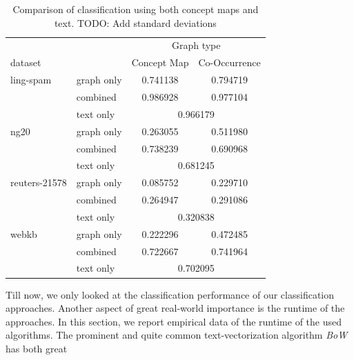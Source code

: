 

\begin{table}[htb!]
\centering
\begin{tabular}{llcc}
  &  & \multicolumn{2}{c}{Graph type} \\
   dataset   & &  Concept Map &  Co-Occurrence \\
\midrule
ling-spam 
          & graph only &  0.741138 &  0.794719\\
          & combined &  0.986928 &  0.977104\\
          & text only & \multicolumn{2}{c}{ 0.966179 }\\
\midrule
ng20 
          & graph only &  0.263055 &  0.511980\\
          & combined &  0.738239 &  0.690968\\
          & text only & \multicolumn{2}{c}{ 0.681245 }\\
\midrule
reuters-21578 
          & graph only &  0.085752 &  0.229710\\
          & combined &  0.264947 &  0.291086\\
          & text only & \multicolumn{2}{c}{ 0.320838 }\\
\midrule
webkb 
          & graph only &  0.222296 &  0.472485\\
          & combined &  0.722667 &  0.741964\\
          & text only & \multicolumn{2}{c}{ 0.702095 }\\	
\bottomrule
\end{tabular}
\caption[Results: Combined text- and graph features]{Comparison of classification using both concept maps and text. TODO: Add standard deviations}%
\label{table:results_comparison_combined}
\end{table}


Till now, we only looked at the classification performance of our classification approaches.
Another aspect of great real-world importance is the runtime of the approaches.
In this section, we report empirical data of the runtime of the used algorithms.
The prominent and quite common text-vectorization algorithm \textit{BoW} has both great 



